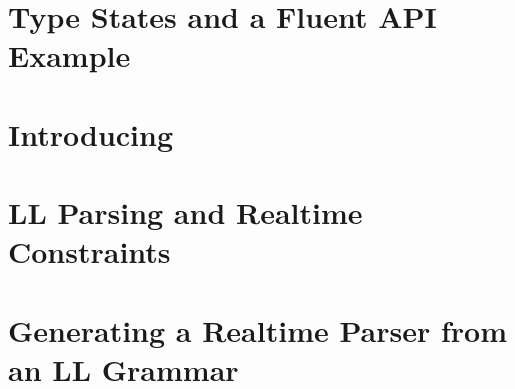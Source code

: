 \normalsize

\section{Type States and a Fluent API Example}
\label{section:example}


\section{Introducing \Fajita}
\label{section:fajita}


\section{LL Parsing and Realtime Constraints}
\label{section:intuition}


\section{Generating a Realtime Parser from an LL Grammar}
\label{section:algorithm}

